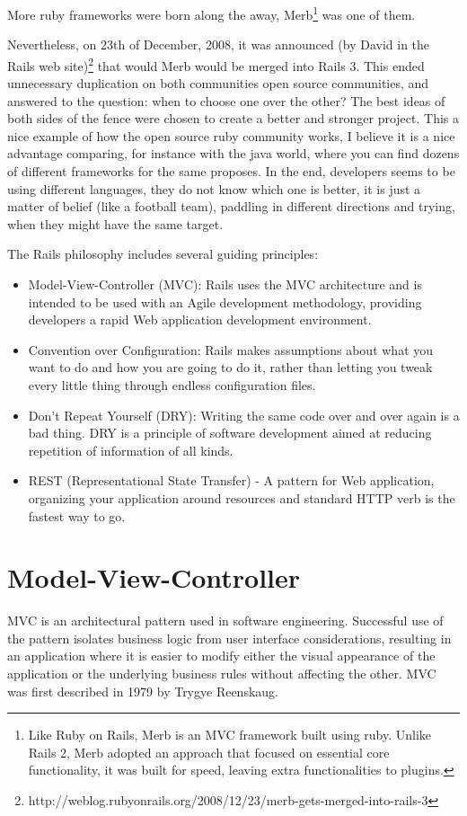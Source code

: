 More ruby frameworks were born along the away, 
\textsf{Merb}\footnote{
 Like Ruby on Rails, Merb is an MVC framework built using ruby.
 Unlike Rails 2, Merb adopted an approach that focused on essential core functionality, 
 it was built for speed, leaving extra functionalities to plugins.
}
was one of them.

Nevertheless, on 23th of December, 2008, it was announced
\textsf{(by David in the Rails web site)}\footnote{
 http://weblog.rubyonrails.org/2008/12/23/merb-gets-merged-into-rails-3
}
that
would Merb would be merged into Rails 3.
This ended unnecessary duplication on both communities open source communities, 
and answered to the question: when to choose one over the other?
The best ideas of both sides of the fence were chosen to create a better and stronger project.
This a nice example of how the open source ruby community works, 
I believe it is a nice advantage comparing, for instance with the java world, 
where you can find dozens of different frameworks for the same proposes.
In the end, developers seems to be using different languages,
they do not know which one is better, it is just a matter of belief (like a football team),
paddling in different directions and trying, when they might have the same target.

The Rails philosophy includes several guiding principles:
\begin{itemize}
\item Model-View-Controller (MVC): Rails uses the MVC architecture and 
      is intended to be used with an Agile development methodology,
      providing developers a rapid Web application development environment.
\item Convention over Configuration: Rails makes assumptions about 
      what you want to do and how you are going to do it, 
      rather than letting you tweak every little thing through endless configuration files.
\item Don’t Repeat Yourself (DRY): Writing the same code over and over again is a bad thing. 
      DRY is a principle of software development aimed at reducing repetition of information of all kinds.
\item REST (Representational State Transfer) - A pattern for Web application, 
      organizing your application around resources and standard HTTP verb is the fastest way to go.
\end{itemize}



\section{Model-View-Controller} 
MVC is an architectural pattern used in software engineering. 
Successful use of the pattern isolates business logic from user interface considerations, 
resulting in an application where it is easier to modify either the visual appearance of the application 
or the underlying business rules without affecting the other.
MVC was first described in 1979 by Trygye Reenskaug.

